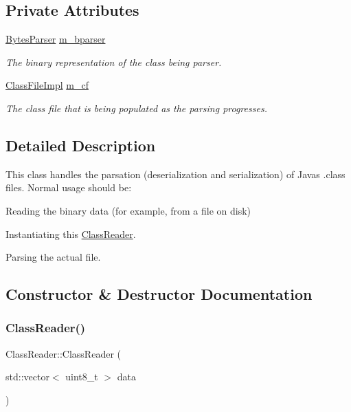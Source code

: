 \subsection*{Private Attributes}
\begin{DoxyCompactItemize}
\item 
\hyperlink{classBytesParser}{Bytes\+Parser} \hyperlink{classClassReader_a11f0ce7b430b8abd5cb74b4273ddaab0}{m\+\_\+bparser}
\begin{DoxyCompactList}\small\item\em The binary representation of the class being parser. \end{DoxyCompactList}\item 
\hyperlink{classClassFileImpl}{Class\+File\+Impl} \hyperlink{classClassReader_ad27b767f0ccf0826b0364977291894bc}{m\+\_\+cf}
\begin{DoxyCompactList}\small\item\em The class file that is being populated as the parsing progresses. \end{DoxyCompactList}\end{DoxyCompactItemize}


\subsection{Detailed Description}
This class handles the parsation (deserialization and serialization) of Java\textquotesingle{}s .class files. Normal usage should be\+:
\begin{DoxyEnumerate}
\item Reading the binary data (for example, from a file on disk)
\item Instantiating this \hyperlink{classClassReader}{Class\+Reader}.
\item Parsing the actual file. 
\end{DoxyEnumerate}

\subsection{Constructor \& Destructor Documentation}
\mbox{\label{classClassReader_a3470778a3f6fe462416950a69c305ff0}} 
\subsubsection{\texorpdfstring{Class\+Reader()}{ClassReader()}}
{\footnotesize\ttfamily Class\+Reader\+::\+Class\+Reader (\begin{DoxyParamCaption}\item[{std\+::vector$<$ uint8\+\_\+t $>$}]{data }\end{DoxyParamCaption})}



